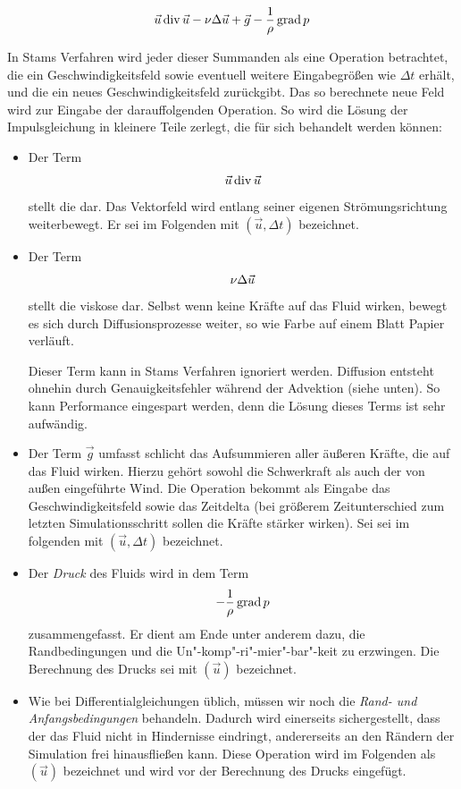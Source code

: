 \begin{equation}
\vec{u} \operatorname*{div} \vec{u} -
\nu \Delta \vec{u} +
\vec{g} -
\frac{
	1
}
{
	\rho
}
\operatorname*{grad} p
\end{equation}

In Stams Verfahren wird jeder dieser Summanden als eine Operation betrachtet,
die ein Geschwindigkeitsfeld sowie eventuell weitere Eingabegrößen wie $\Delta
t$ erhält, und die ein neues Geschwindigkeitsfeld zurückgibt. Das so berechnete
neue Feld wird zur Eingabe der darauffolgenden Operation. So wird die Lösung der
Impulsgleichung in kleinere Teile zerlegt, die für sich behandelt werden können:

\begin{itemize}
\item
	Der Term
	\begin{equation}
	\vec{u} \operatorname*{div} \vec{u}
	\end{equation}
	stellt die  dar. Das Vektorfeld wird entlang
	seiner eigenen Strömungsrichtung weiterbewegt. Er sei im Folgenden mit
	$(\vec{u},\Delta t)$ bezeichnet.
\item
	Der Term
	\begin{equation}
	\nu \Delta \vec{u}
	\end{equation}
	stellt die viskose  dar. Selbst wenn keine
	Kräfte auf das Fluid wirken, bewegt es sich durch Diffusionsprozesse
	weiter, so wie Farbe auf einem Blatt Papier verläuft.

	Dieser Term kann in Stams Verfahren ignoriert werden. Diffusion entsteht
	ohnehin  durch Genauigkeitsfehler während der
	Advektion (siehe unten). So kann Performance eingespart werden, denn die
	Lösung dieses Terms ist sehr aufwändig.
\item
	Der Term $\vec{g}$ umfasst schlicht das Aufsummieren aller äußeren
	Kräfte, die auf das Fluid wirken. Hierzu gehört sowohl die Schwerkraft
	als auch der von außen eingeführte Wind. Die Operation bekommt als
	Eingabe das Geschwindigkeitsfeld sowie das Zeitdelta (bei größerem
	Zeitunterschied zum letzten Simulationsschritt sollen die Kräfte
	stärker wirken). Sei sei im folgenden mit
	$(\vec{u},\Delta t)$ bezeichnet.
\item
	Der \emph{Druck} des Fluids wird in dem Term
	\begin{equation}
	-\frac{1}{\rho} \operatorname*{grad} p
	\end{equation}
	zusammengefasst. Er dient am Ende unter anderem dazu, die
	Randbedingungen und die Un"-komp"-ri"-mier"-bar"-keit zu erzwingen. Die Berechnung
	des Drucks sei mit $(\vec{u})$
	bezeichnet.
\item
	Wie bei Differentialgleichungen üblich, müssen wir noch die
	\emph{Rand- und Anfangsbedingungen} behandeln. Dadurch wird
	einerseits sichergestellt, dass der das Fluid nicht in Hindernisse
	eindringt, andererseits an den Rändern der Simulation frei hinausfließen
	kann. Diese Operation wird im Folgenden als
	$(\vec{u})$ bezeichnet und wird vor der
	Berechnung des Drucks eingefügt.
\end{itemize}

